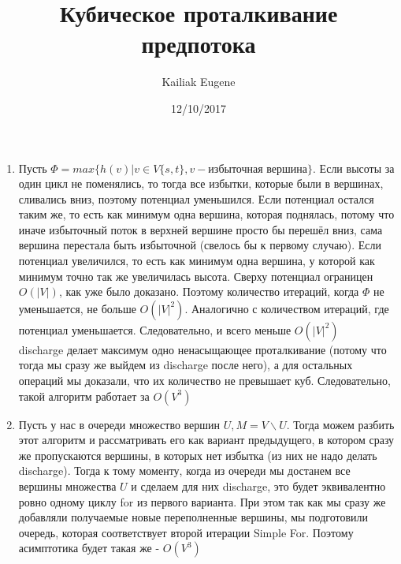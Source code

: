\documentclass[12pt]{article}
\title{Кубическое проталкивание предпотока}
\date{12/10/2017}
\author{Kailiak Eugene}
\begin{document}
\maketitle
\begin{enumerate}
\item
Пусть $\Phi = max\{h(v) | v \in V\{s,t\}, v - $избыточная вершина$\}$. Если высоты за один цикл не поменялись, то тогда все избытки, которые были в вершинах, сливались вниз, поэтому потенциал уменьшился. Если потенциал остался таким же, то есть как минимум одна вершина, которая поднялась, потому что иначе избыточный поток в верхней вершине просто бы перешёл вниз, сама вершина перестала быть избыточной (свелось бы к первому случаю). Если потенциал увеличился, то есть как минимум одна вершина, у которой как минимум точно так же увеличилась высота. Сверху потенциал ограницен $O(|V|)$, как уже было доказано. Поэтому количество итераций, когда $\Phi$ не уменьшается, не больше $O(|V|^2)$. Аналогично с количеством итераций, где потенциал уменьшается. Следовательно, и всего меньше $O(|V|^2)$ \\
discharge делает максимум одно ненасыщающее проталкивание (потому что тогда мы сразу же выйдем из discharge после него), а для остальных операций мы доказали, что их количество не превышает куб. Следовательно, такой алгоритм работает за $O(V^3)$
\item
Пусть у нас в очереди множество вершин $U, M = V \backslash U$. Тогда можем разбить этот алгоритм и рассматривать его как вариант предыдущего, в котором сразу же пропускаются вершины, в которых нет избытка (из них не надо делать discharge). Тогда к тому моменту, когда из очереди мы достанем все вершины множества $U$ и сделаем для них discharge, это будет эквивалентно ровно одному циклу for из первого варианта. При этом так как мы сразу же добавляли получаемые новые переполненные вершины, мы подготовили очередь, которая соответствует второй итерации Simple For. Поэтому асимптотика будет такая же - $O({V}^3)$
\end{enumerate}
\end{document}
